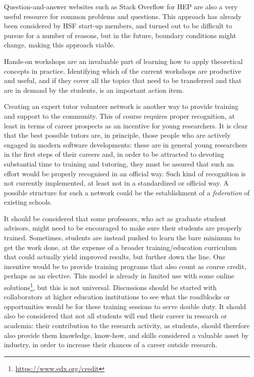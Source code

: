 \documentclass[12pt,a4paper]{article}
\begin{document}
Question-and-answer websites such as Stack Overflow for HEP are also a very
useful resource for common problems and questions. This approach has already
been considered by HSF start-up members, and turned out to be difficult to
pursue for a number of reasons, but in the future, boundary conditions might
change, making this approach viable.

Hands-on workshops are an invaluable part of learning how to apply theoretical
concepts in practice. Identifying which of the current workshops are productive
and useful, and if they cover all the topics that need to be transferred and
that are in demand by the students, is an important action item.

Creating an expert tutor volunteer network is another way to provide training
and support to the community.
This of course requires proper recognition, at least in terms of career
prospects as an incentive for young researchers. It is clear that the best
possible tutors are, in principle, those people who are actively engaged in
modern software developments: these are in general young researchers in the
first steps of their careers and, in order to be attracted to devoting
substantial time to training and tutoring, they must be assured that such an
effort would be properly recognised in an official way. Such kind of recognition
is not currently implemented, at least not in a standardized or official way. A
possible structure for such a network could be the establishment of a {\em
federation} of existing schools.

It should be considered that some professors, who act as graduate student
advisors, might need to be encouraged to make sure their students are properly
trained. Sometimes, students are instead pushed to learn the bare minimum to get
the work done, at the expense of a broader training/education curriculum that
could actually yield improved results, but further down the line. One incentive
would be to provide training programs that also count as course credit, perhaps
as an elective. This model is already in limited use with some online
solutions\footnote{\url{https://www.edx.org/credit}}, but this is not universal.
Discussions should be started with collaborators at higher education
institutions to see what the roadblocks or opportunities would be for these
training sessions to serve double duty.
It should also be considered that not all students will end their career in
research or academia: their contribution to the research activity, as students,
should therefore also provide them knowledge, know-how, and skills considered a
valuable asset by industry, in order to increase their chances of a career
outside research.
\end{document}
